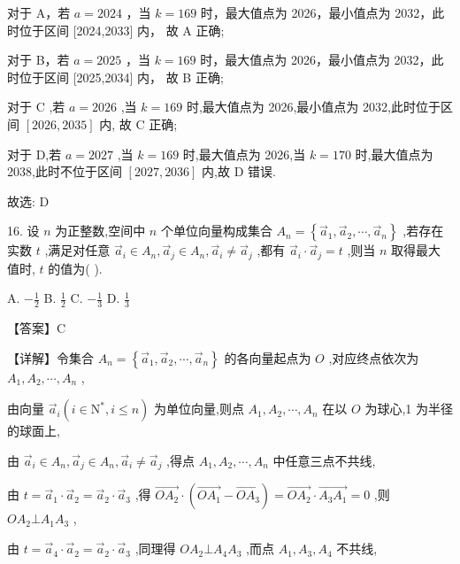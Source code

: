 \documentclass[10pt]{article}
\begin{document}
对于 A，若 \(a = {2024}\) ，当 \(k = {169}\) 时，最大值点为 2026，最小值点为 2032，此时位于区间 [2024,2033] 内， 故 A 正确;

对于 B，若 \(a = {2025}\) ，当 \(k = {169}\) 时，最大值点为 2026，最小值点为 2032，此时位于区间 [2025,2034] 内， 故 B 正确;

对于 \(\mathrm{C}\) ,若 \(a = {2026}\) ,当 \(k = {169}\) 时,最大值点为 2026,最小值点为 2032,此时位于区间 \(\left\lbrack  {{2026},{2035}}\right\rbrack\) 内, 故 C 正确;

对于 D,若 \(a = {2027}\) ,当 \(k = {169}\) 时,最大值点为 2026,当 \(k = {170}\) 时,最大值点为 2038,此时不位于区间 \(\left\lbrack  {{2027},{2036}}\right\rbrack\) 内,故 D 错误.

故选: D

16. 设 \(n\) 为正整数,空间中 \(n\) 个单位向量构成集合 \({A}_{n} = \left\{  {{\overrightarrow{a}}_{1},{\overrightarrow{a}}_{2},\cdots ,{\overrightarrow{a}}_{n}}\right\}\) ,若存在实数 \(t\) ,满足对任意 \({\overrightarrow{a}}_{i} \in  {A}_{n},{\overrightarrow{a}}_{j} \in  {A}_{n},{\overrightarrow{a}}_{i} \neq  {\overrightarrow{a}}_{j}\) ,都有 \({\overrightarrow{a}}_{i} \cdot  {\overrightarrow{a}}_{j} = t\) ,则当 \(n\) 取得最大值时, \(t\) 的值为( ).

A. \(- \frac{1}{2}\) B. \(\frac{1}{2}\) C. \(- \frac{1}{3}\) D. \(\frac{1}{3}\)

【答案】C

【详解】令集合 \({A}_{n} = \left\{  {{\overrightarrow{a}}_{1},{\overrightarrow{a}}_{2},\cdots ,{\overrightarrow{a}}_{n}}\right\}\) 的各向量起点为 \(O\) ,对应终点依次为 \({A}_{1},{A}_{2},\cdots ,{A}_{n}\) ,

由向量 \({\overrightarrow{a}}_{i}\left( {i \in  {\mathrm{N}}^{ * },i \leq  n}\right)\) 为单位向量,则点 \({A}_{1},{A}_{2},\cdots ,{A}_{n}\) 在以 \(O\) 为球心,1 为半径的球面上,

由 \({\overrightarrow{a}}_{i} \in  {A}_{n},{\overrightarrow{a}}_{j} \in  {A}_{n},{\overrightarrow{a}}_{i} \neq  {\overrightarrow{a}}_{j}\) ,得点 \({A}_{1},{A}_{2},\cdots ,{A}_{n}\) 中任意三点不共线,

由 \(t = {\overrightarrow{a}}_{1} \cdot  {\overrightarrow{a}}_{2} = {\overrightarrow{a}}_{2} \cdot  {\overrightarrow{a}}_{3}\) ,得 \(\overrightarrow{O{A}_{2}} \cdot  \left( {\overrightarrow{O{A}_{1}} - \overrightarrow{O{A}_{3}}}\right)  = \overrightarrow{O{A}_{2}} \cdot  \overrightarrow{{A}_{3}{A}_{1}} = 0\) ,则 \(O{A}_{2} \bot  {A}_{1}{A}_{3}\) ,

由 \(t = {\overrightarrow{a}}_{4} \cdot  {\overrightarrow{a}}_{2} = {\overrightarrow{a}}_{2} \cdot  {\overrightarrow{a}}_{3}\) ,同理得 \(O{A}_{2} \bot  {A}_{4}{A}_{3}\) ,而点 \({A}_{1},{A}_{3},{A}_{4}\) 不共线,
\end{document}
